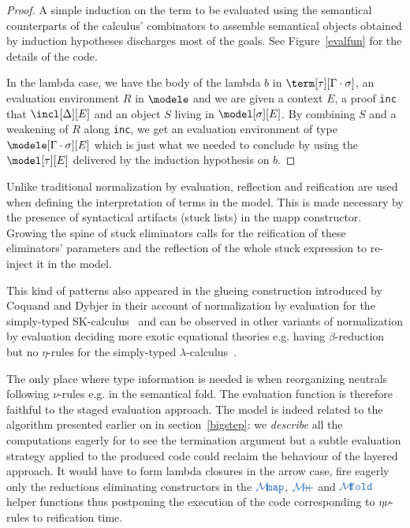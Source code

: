 \documentclass[preprint]{sigplanconf}
\begin{document}
\begin{proof}A simple induction on the term to be evaluated using the semantical
counterparts of the calculus' combinators to assemble semantical objects obtained
by induction hypotheses discharges most of the goals. See Figure~\ref{evalfun}
for the details of the code.

In the lambda case, we have the body of the lambda $b$ in $\term[\tau][\Gamma \cdot \sigma]$,
an evaluation environment $R$ in $\modele$ and we are given a context $E$, a proof
\texttt{inc} that $\incl[\Delta][E]$ and an object $S$ living in $\model[\sigma][E]$.
By combining $S$ and a weakening of $R$ along \texttt{inc}, we get an evaluation
environment of type $\modele[\Gamma \cdot \sigma][E]$ which is just what we needed
to conclude by using the $\model[\tau][E]$ delivered by the induction hypothesis
on $b$.
\end{proof}

\begin{remark}Unlike traditional normalization by evaluation, reflection and
reification are used when defining the interpretation of terms in the model.
This is made necessary by the presence of syntactical artifacts (stuck lists)
in the mapp constructor. Growing the spine of stuck eliminators calls for the
reification of these eliminators' parameters and the reflection of the whole
stuck expression to re-inject it in the model.

This kind of patterns also appeared in the glueing construction introduced by
Coquand and Dybjer in their account of normalization by evaluation for
the simply-typed SK-calculus~\cite{CoqDyb97} and can be observed in other
variants of normalization by evaluation deciding more exotic equational
theories e.g. having $\beta$-reduction but no $\eta$-rules for the simply-typed
$\lambda$-calculus~\cite{ArranSlides}.
\end{remark}

\begin{remark}The only place where type information is needed is when
reorganizing neutrals following $\nu$-rules e.g. in the semantical fold.
The evaluation function is therefore faithful to the staged evaluation approach.
The model is indeed related to the algorithm presented earlier on in
section~\ref{bigstep}: we \emph{describe} all the computations eagerly for
\agda{} to see the termination argument but a subtle evaluation strategy
applied to the produced code could reclaim the behaviour of the layered
approach. It would have to form lambda closures in the arrow case, fire
eagerly only the reductions eliminating constructors in the $\vmap$,
$\vappend$ and $\vfold$ helper functions thus postponing the execution
of the code corresponding to $\eta\nu$-rules to reification time.
\end{remark}
\end{document}
